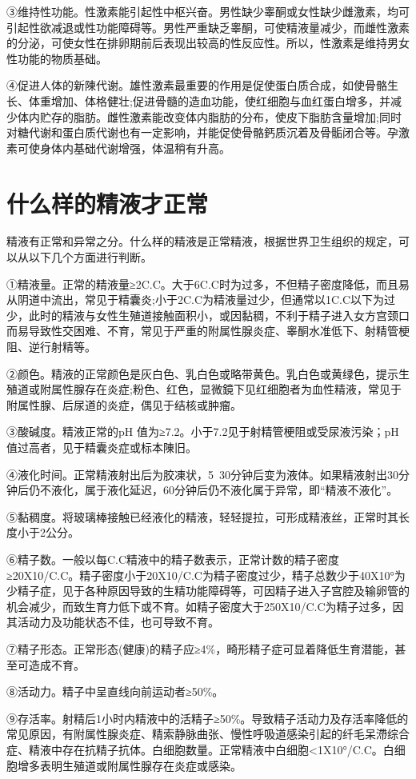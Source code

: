 \documentclass[12pt,UTF8]{ctexbook}
\begin{document}
③维持性功能。性激素能引起性中枢兴奋。男性缺少睾酮或女性缺少雌激素，均可引起性欲减退或性功能障碍等。男性严重缺乏睾酮，可使精液量减少，而雌性激素的分泌，可使女性在排卵期前后表现出较高的性反应性。所以，性激素是维持男女性功能的物质基础。

④促进人体的新陳代谢。雄性激素最重要的作用是促使蛋白质合成，如使骨骼生长、体重增加、体格健壮;促进骨髓的造血功能，使红细胞与血红蛋白增多，并减少体内贮存的脂肪。雌性激素能改变体内脂肪的分布，使皮下脂肪含量增加;同时对糖代谢和蛋白质代谢也有一定影响，并能促使骨骼鈣质沉着及骨骺闭合等。孕激素可使身体内基础代谢增强，体温稍有升高。

\section{什么样的精液才正常}

精液有正常和异常之分。什么样的精液是正常精液，根据世界卫生组织的规定，可以从以下几个方面进行判断。

①精液量。正常的精液量≥2C.C。大于6C.C时为过多，不但精子密度降低，而且易从阴道中流出，常见于精囊炎;小于2C.C为精液量过少，但通常以1C.C以下为过少，此时的精液与女性生殖道接触面积小，或因黏稠，不利于精子进入女方宫颈口而易导致性交困难、不育，常见于严重的附属性腺炎症、睾酮水准低下、射精管梗阻、逆行射精等。

②颜色。精液的正常颜色是灰白色、乳白色或略带黄色。乳白色或黄绿色，提示生殖道或附属性腺存在炎症;粉色、红色，显微鏡下见红细胞者为血性精液，常见于附属性腺、后尿道的炎症，偶见于结核或肿瘤。

③酸碱度。精液正常的pH 值为≥7.2。小于7.2见于射精管梗阻或受尿液污染；pH值过高者，见于精囊炎症或标本陳旧。

④液化时间。正常精液射出后为胶凍状，5~30分钟后变为液体。如果精液射出30分钟后仍不液化，属于液化延迟，60分钟后仍不液化属于异常，即“精液不液化”。

⑤黏稠度。将玻璃棒接触已经液化的精液，轻轻提拉，可形成精液丝，正常时其长度小于2公分。

⑥精子数。一般以每C.C精液中的精子数表示，正常计数的精子密度≥20X10/C.C。精子密度小于20X10/C.C为精子密度过少，精子总数少于40X10°为少精子症，见于各种原因导致的生精功能障碍等，可因精子进入子宫腔及输卵管的机会减少，而致生育力低下或不育。如精子密度大于250X10/C.C为精子过多，因其活动力及功能状态不佳，也可导致不育。

⑦精子形态。正常形态(健康)的精子应≥4\%，畸形精子症可显着降低生育潜能，甚至可造成不育。

⑧活动力。精子中呈直线向前运动者≥50\%。

⑨存活率。射精后1小时内精液中的活精子≥50\%。导致精子活动力及存活率降低的常见原因，有附属性腺炎症、精索静脉曲张、慢性呼吸道感染引起的纤毛呆滯综合症、精液中存在抗精子抗体。白细胞数量。正常精液中白细胞<1X10°/C.C。白细胞增多表明生殖道或附属性腺存在炎症或感染。
\end{document}
